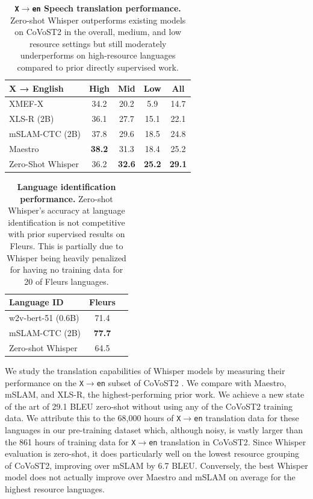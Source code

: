 \documentclass[nohyperref]{article}
\theoremstyle{plain}
\theoremstyle{definition}
\theoremstyle{remark}
\begin{document}
\begin{table}[t]
\vskip 0.15in
\begin{center}
\begin{tabular}{l|ccc|c}
\toprule
 X → English & High & Mid & Low & All \\
\midrule
XMEF-X & 34.2 & 20.2 & 5.9 & 14.7 \\
XLS-R (2B) & 36.1 & 27.7 & 15.1 & 22.1 \\
mSLAM-CTC (2B) & 37.8 & 29.6 & 18.5 & 24.8 \\
Maestro & \textbf{38.2} & 31.3 & 18.4 & 25.2 \\
\midrule
Zero-Shot Whisper & 36.2 & \textbf{32.6} & \textbf{25.2} & \textbf{29.1} \\
\bottomrule
\end{tabular}
\caption{\textbf{\texttt{X$\rightarrow$en} Speech translation performance.} Zero-shot Whisper outperforms existing models on CoVoST2 in the overall, medium, and low resource settings but still moderately underperforms on high-resource languages compared to prior directly supervised work.}
\label{translate_table}
\end{center}
\vspace{-1em}
\end{table}

\begin{table}[t]
\vskip 0.15in
\begin{center}
\begin{tabular}{l|cc}
\toprule
 Language ID & Fleurs \\
\midrule
w2v-bert-51 (0.6B) & 71.4 \\
mSLAM-CTC (2B) & \textbf{77.7} \\
\midrule
Zero-shot Whisper & 64.5 \\
\bottomrule
\end{tabular}
\caption{\textbf{Language identification performance.} Zero-shot Whisper's accuracy at language identification is not competitive with prior supervised results on Fleurs. This is partially due to Whisper being heavily penalized for having no training data for 20 of Fleurs languages.}
\label{lang_id_table}
\end{center}
\vspace{-1em}
\end{table}

We study the translation capabilities of Whisper models by measuring their performance on the \texttt{X$\rightarrow$en} subset of CoVoST2 \cite{wang2020covost}. We compare with Maestro, mSLAM, and XLS-R, the highest-performing prior work. We achieve a new state of the art of 29.1 BLEU zero-shot without using any of the CoVoST2 training data. We attribute this to the 68,000 hours of \texttt{X$\rightarrow$en} translation data for these languages in our pre-training dataset which, although noisy, is vastly larger than the 861 hours of training data for \texttt{X$\rightarrow$en} translation in CoVoST2. Since Whisper evaluation is zero-shot, it does particularly well on the lowest resource grouping of CoVoST2, improving over mSLAM by 6.7 BLEU. Conversely, the best Whisper model does not actually improve over Maestro and mSLAM on average for the highest resource languages.
\end{document}
